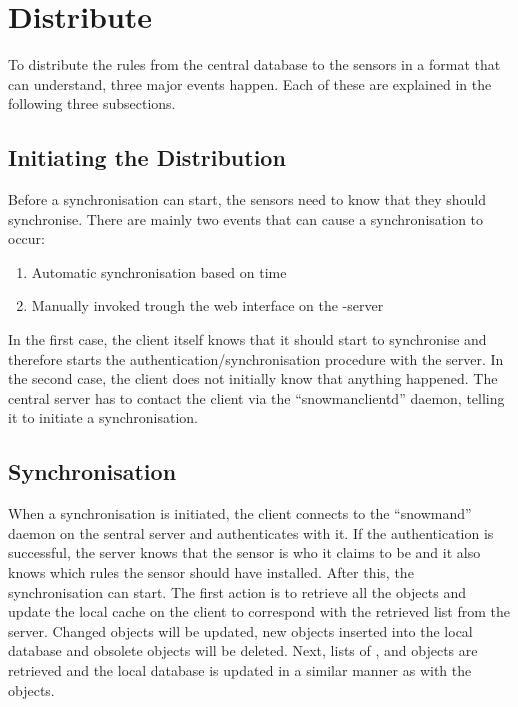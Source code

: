 \section{Distribute}
To distribute the rules from the central database to the sensors in a format
that \snort{} can understand, three major events happen. Each of these
are explained in the following three subsections.

\subsection{Initiating the Distribution}

Before a synchronisation can start, the sensors  need to know that they
should synchronise. There are mainly two events that can cause a synchronisation
to occur:

\begin{enumerate}
  \item Automatic synchronisation based on time
  \item Manually invoked trough the web interface on the \snowman{}-server
\end{enumerate}

In the first case, the client itself knows that it should start to synchronise
and therefore starts the authentication/synchronisation procedure with the
server. In the second case, the client does not initially know that anything
happened. The central server has to contact the client via the
``snowmanclientd'' daemon, telling it to initiate a synchronisation.

\subsection{Synchronisation}

When a synchronisation is initiated, the client connects to the ``snowmand''
daemon on the sentral server and authenticates with it. If the authentication is
successful, the server knows that the sensor is who it claims to be and it also
knows which rules the sensor should have installed.
After this, the synchronisation can start. The first action is to retrieve all
the  objects and update the local cache on the client to
correspond with the retrieved list from the server. Changed objects will be
updated, new objects inserted into the local database and obsolete objects will
be deleted. Next, lists of ,
 and  objects are
retrieved and the local database is updated in a similar manner as with the
 objects.

